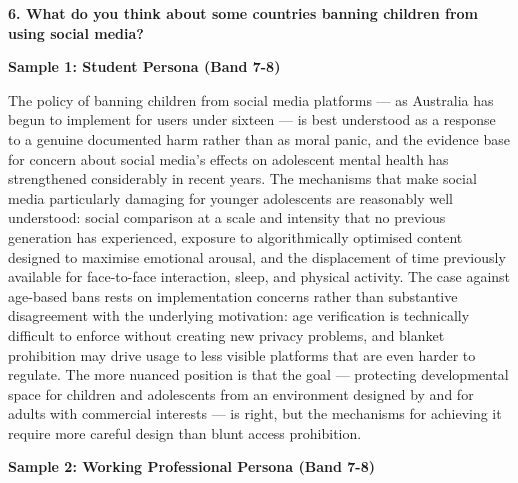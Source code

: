 \separator

\begin{ieltsquestion}
\textbf{6. What do you think about some countries banning children from using social media?}
\end{ieltsquestion}
\textbf{Sample 1: Student Persona (Band 7-8)}

The policy of banning children from social media platforms — as Australia has begun to implement for users under sixteen — is best understood as a response to a genuine documented harm rather than as moral panic, and the evidence base for concern about social media's effects on adolescent mental health has strengthened considerably in recent years. The mechanisms that make social media particularly damaging for younger adolescents are reasonably well understood: social comparison at a scale and intensity that no previous generation has experienced, exposure to algorithmically optimised content designed to maximise emotional arousal, and the displacement of time previously available for face-to-face interaction, sleep, and physical activity. The case against age-based bans rests on implementation concerns rather than substantive disagreement with the underlying motivation: age verification is technically difficult to enforce without creating new privacy problems, and blanket prohibition may drive usage to less visible platforms that are even harder to regulate. The more nuanced position is that the goal — protecting developmental space for children and adolescents from an environment designed by and for adults with commercial interests — is right, but the mechanisms for achieving it require more careful design than blunt access prohibition.

\textbf{Sample 2: Working Professional Persona (Band 7-8)}

